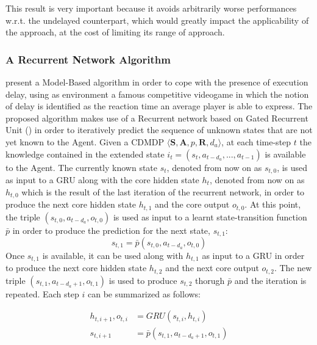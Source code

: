                 This result is very important because it avoids arbitrarily worse performances w.r.t. the undelayed counterpart, which would greatly impact the applicability of the approach, at the cost of limiting its range of approach.
            
            \subsubsection{A Recurrent Network Algorithm}
                \label{subsub:modelbased_recurrent}            
                 present a Model-Based algorithm in order to cope with the presence of execution delay, using as environment a famous competitive videogame in which the notion of delay is identified as the reaction time an average player is able to express. The proposed algorithm makes use of a Recurrent network based on Gated Recurrent Unit () in order to iteratively predict the sequence of unknown states that are not yet known to the Agent. Given a CDMDP $\langle \mathbf{S}, \mathbf{A}, p, \mathbf{R}, d_a\rangle$, at each time-step $t$ the knowledge contained in the extended state $i_t = \left( s_{t}, a_{t-d_a},..., a_{t-1}\right)$ is available to the Agent. The currently known state $s_t$, denoted from now on as $s_{t, 0}$, is used as input to a GRU along with the core hidden state $h_t$, denoted from now on as $h_{t, 0}$ which is the result of the last iteration of the recurrent network, in order to produce the next core hidden state $h_{t, 1}$ and the core output $o_{t, 0}$. At this point, the triple $(s_{t, 0}, a_{t-d_a}, o_{t, 0})$ is used as input to a learnt state-transition function $\bar{p}$ in order to produce the prediction for the next state, $s_{t, 1}$:
                \[ s_{t, 1} = \bar{p}(s_{t, 0}, a_{t-d_a}, o_{t, 0}) \]
                Once $s_{t, 1}$ is available, it can be used along with $h_{t, 1}$ as input to a GRU in order to produce the next core hidden state $h_{t, 2}$ and the next core output $o_{t, 2}$. The new triple $(s_{t, 1}, a_{t-d_a+1}, o_{t, 1})$ is used to produce $s_{t, 2}$ thorugh $\bar{p}$ and the iteration is repeated. Each step $i$ can be summarized as follows:
                
                \begin{align*}
                    h_{t, i+1}, o_{t, i} &= GRU(s_{t, i}, h_{t, i})\\
                    s_{t, i+1} &= \bar{p}(s_{t, 1}, a_{t-d_a+1}, o_{t, 1})
                \end{align*}
                
